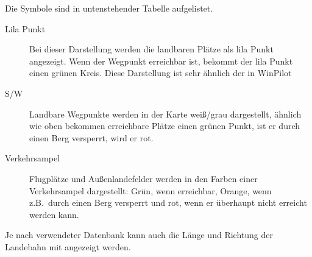 Die Symbole sind in untenstehender Tabelle aufgelistet. 
\begin{description}
   \item[Lila Punkt] Bei dieser Darstellung werden die landbaren Plätze als lila Punkt angezeigt. Wenn der Wegpunkt erreichbar ist, bekommt der lila Punkt einen grünen Kreis.  Diese Darstellung ist sehr ähnlich der in WinPilot
   \item[S/W]  Landbare Wegpunkte werden in der Karte weiß/grau dargestellt, ähnlich wie oben bekommen erreichbare Plätze einen grünen Punkt, ist er durch einen Berg versperrt, wird er rot. 
   \item[Verkehrsampel] Flugplätze und Außenlandefelder werden in den Farben einer Verkehrsampel dargestellt: Grün, wenn erreichbar, Orange, wenn z.B.\ durch einen Berg versperrt und rot, wenn er überhaupt nicht erreicht werden kann.
\end{description}

\tip Je nach verwendeter Datenbank kann auch die Länge und Richtung der Landebahn mit angezeigt werden. 

